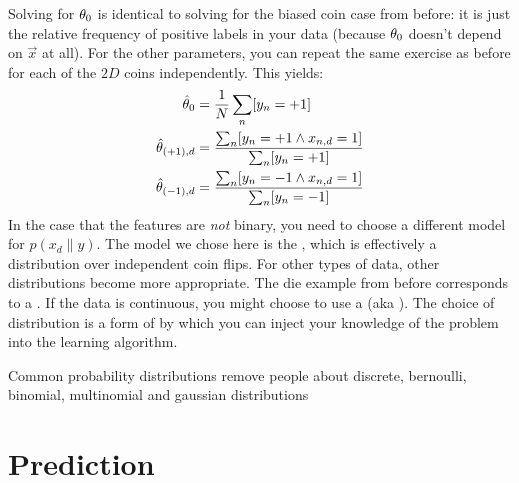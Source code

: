 %
Solving for $\theta_0$ is identical to solving for the biased coin case
from before: it is just the relative frequency of positive labels in
your data (because $\theta_0$ doesn't depend on $\vec x$ at all).  For
the other parameters, you can repeat the same exercise as before for
each of the $2D$ coins independently.  This yields:
%
\begin{align}
  \hat{\theta}_0 &= \frac 1 N \sum_n [y_n = +1] \\
  \hat{\theta}_{(+1),d} &= \frac {\sum_n [y_n = +1 \land x_{n,d} = 1]}  {\sum_n [y_n = +1]}\\
  \hat{\theta}_{(-1),d} &= \frac {\sum_n [y_n = -1 \land x_{n,d} = 1]}  {\sum_n [y_n = -1]}
\end{align}
%
In the case that the features are \emph{not} binary, you need to
choose a different model for $p(x_d \| y)$.  The model we chose here
is the , which is effectively a
distribution over independent coin flips.  For other types of data,
other distributions become more appropriate.  The die example from
before corresponds to a .  If the data
is continuous, you might choose to use a  (aka ).  The choice of
distribution is a form of  by which you can
inject your knowledge of the problem into the learning algorithm.

\begin{mathreview}{Common probability distributions}
  remove people about discrete, bernoulli, binomial, multinomial and
  gaussian distributions
\end{mathreview}


\section{Prediction}

